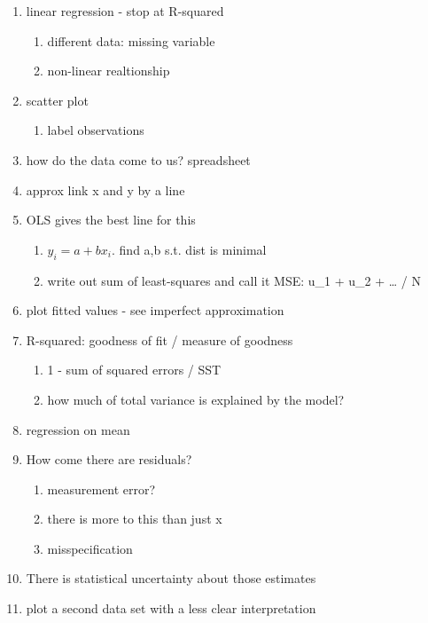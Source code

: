 \documentclass[]{book}
\providecommand{\tightlist}{%
  \setlength{\itemsep}{0pt}\setlength{\parskip}{0pt}}
\theoremstyle{definition}
\theoremstyle{definition}
\theoremstyle{definition}
\theoremstyle{remark}
\begin{document}
\begin{enumerate}
\def\labelenumi{\arabic{enumi}.}
\tightlist
\item
  linear regression - stop at R-squared

  \begin{enumerate}
  \def\labelenumii{\arabic{enumii}.}
  \tightlist
  \item
    different data: missing variable
  \item
    non-linear realtionship
  \end{enumerate}
\item
  scatter plot

  \begin{enumerate}
  \def\labelenumii{\arabic{enumii}.}
  \tightlist
  \item
    label observations
  \end{enumerate}
\item
  how do the data come to us? spreadsheet
\item
  approx link x and y by a line
\item
  OLS gives the best line for this

  \begin{enumerate}
  \def\labelenumii{\arabic{enumii}.}
  \tightlist
  \item
    \(y_i = a+b x_i\). find a,b s.t. dist is minimal
  \item
    write out sum of least-squares and call it MSE: u\_1 + u\_2 +
    \ldots{} / N
  \end{enumerate}
\item
  plot fitted values - see imperfect approximation
\item
  R-squared: goodness of fit / measure of goodness

  \begin{enumerate}
  \def\labelenumii{\arabic{enumii}.}
  \tightlist
  \item
    1 - sum of squared errors / SST
  \item
    how much of total variance is explained by the model?
  \end{enumerate}
\item
  regression on mean
\item
  How come there are residuals?

  \begin{enumerate}
  \def\labelenumii{\arabic{enumii}.}
  \tightlist
  \item
    measurement error?
  \item
    there is more to this than just x
  \item
    misspecification
  \end{enumerate}
\item
  There is statistical uncertainty about those estimates
\item
  plot a second data set with a less clear interpretation


\end{enumerate}
\end{document}
